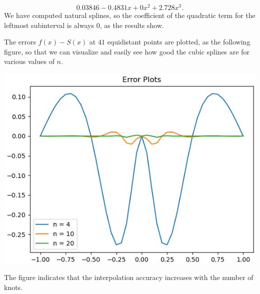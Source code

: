 \documentclass{article}
\begin{document}
\[
0.03846 -0.4831 x + 0 x^2 + 2.728x^3.
\] We have computed natural splines, so the coefficient of the quadratic term for the leftmost subinterval is always $0$, as the results show. \par  
The errors $f(x) - S(x)$ at $41$ equidistant points are plotted, as the following figure, so that we can visualize and easily see how good the cubic splines are for various values of $n$. 
\begin{center}
    \includegraphics[width=0.85\linewidth]{3313.JPG}
\end{center} \par 
The figure indicates that the interpolation accuracy increases with the number of knots.
\end{document}
